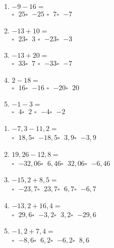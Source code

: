 \documentclass[11pt]{article}
\begin{document}
\begin{multicols}{2}
\begin{exercicedevoir}[5][QCM]
\begin{enumerate}[itemsep=0.5em]
\item $ -9-16 =$\\ $\square\;$ $25$\qquad $\square\;$ $-25$\qquad
$\square\;$ $7$\qquad $\square\;$ $-7$\qquad
\item $ -13+10 =$ \\ $\square\;$ $23$\qquad $\square\;$ $3$\qquad
$\square\;$ $-23$\qquad $\square\;$ $-3$\qquad
\item $ -13+20 =$ \\ $\square\;$ $33$\qquad $\square\;$ $7$\qquad
$\square\;$ $-33$\qquad $\square\;$ $-7$\qquad
\item $ 2-18 =$ \\ $\square\;$ $16$\qquad $\square\;$ $-16$\qquad
$\square\;$ $-20$\qquad $\square\;$ $20$\qquad
\item $ -1-3 =$ \\ $\square\;$ $4$\qquad $\square\;$ $2$\qquad
$\square\;$ $-4$\qquad $\square\;$ $-2$\qquad
\end{enumerate}
\end{exercicedevoir}

\begin{exercicedevoir}[5][QCM]
\begin{enumerate}[itemsep=0.5em]
\item  $ -7{,}3-11{,}2 =$ \\ $\square\;$ $18{,}5$\qquad $\square\;$ $-18{,}5$\qquad $\square\;$ $3{,}9$\qquad $\square\;$ $-3{,}9$\qquad  
\item  $ 19{,}26-12{,}8 =$ \\ $\square\;$ $-32{,}06$\qquad $\square\;$ $6{,}46$\qquad $\square\;$ $32{,}06$\qquad $\square\;$ $-6{,}46$\qquad  
\item  $ -15{,}2+8{,}5 =$ \\ $\square\;$ $-23{,}7$\qquad $\square\;$ $23{,}7$\qquad $\square\;$ $6{,}7$\qquad $\square\;$ $-6{,}7$\qquad  
\item  $ -13{,}2+16{,}4 =$ \\ $\square\;$ $29{,}6$\qquad $\square\;$ $-3{,}2$\qquad $\square\;$ $3{,}2$\qquad $\square\;$ $-29{,}6$\qquad  
\item  $ -1{,}2+7{,}4 =$ \\ $\square\;$ $-8{,}6$\qquad $\square\;$ $6{,}2$\qquad $\square\;$ $-6{,}2$\qquad $\square\;$ $8{,}6$\qquad  
\end{enumerate}
\end{exercicedevoir}
\end{multicols}
\end{document}
